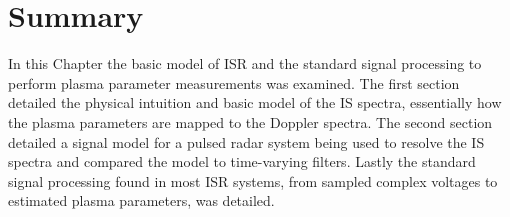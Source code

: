 \section{Summary}
In this Chapter the basic model of ISR and the standard signal processing to perform plasma parameter measurements was examined. The first section detailed the physical intuition and basic model of the IS spectra, essentially how the plasma parameters are mapped to the Doppler spectra. The second section detailed a signal model for a pulsed radar system being used to resolve the IS spectra and compared the model to time-varying filters. Lastly the standard signal processing found in most ISR systems, from sampled complex voltages to estimated plasma parameters, was detailed.
%


 
 
 
 
 
